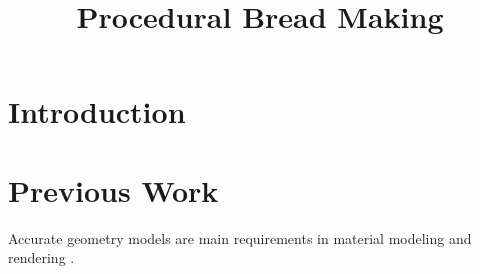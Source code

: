 \documentclass[final,5p,times]{elsarticle}
\begin{document}
\begin{frontmatter}



\title{Procedural Bread Making}


\author{}

\address{}

\begin{abstract}

\end{abstract}

\begin{keyword}


\end{keyword}

\end{frontmatter}

\linenumbers

\section{Introduction}


\section{Previous Work}
Accurate geometry models are main requirements in material modeling and rendering \cite{Dorsey2007}. 
\end{document}
